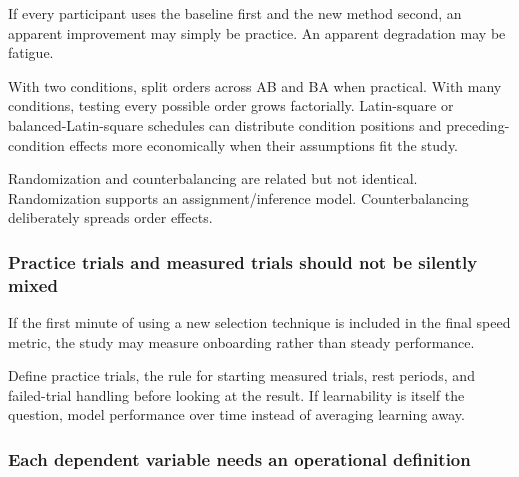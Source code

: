 \hypertarget{04-visual-computing-ii-ch035-counterbalancing-stops-condition-order-from-becoming-a-hidden-treatment}{}

If every participant uses the baseline first and the new method second, an apparent improvement may simply be practice. An apparent degradation may be fatigue.

With two conditions, split orders across AB and BA when practical. With many conditions, testing every possible order grows factorially. Latin-square or balanced-Latin-square schedules can distribute condition positions and preceding-condition effects more economically when their assumptions fit the study.

Randomization and counterbalancing are related but not identical. Randomization supports an assignment/inference model. Counterbalancing deliberately spreads order effects.

\begin{allmightroleexercise}

\subsubsection{Practice trials and measured trials should not be silently mixed}\label{04-visual-computing-ii-ch035-practice-trials-and-measured-trials-should-not-be-silently-mixed}

\hypertarget{04-visual-computing-ii-ch035-practice-trials-and-measured-trials-should-not-be-silently-mixed}{}

If the first minute of using a new selection technique is included in the final speed metric, the study may measure onboarding rather than steady performance.

\end{allmightroleexercise}

Define practice trials, the rule for starting measured trials, rest periods, and failed-trial handling before looking at the result. If learnability is itself the question, model performance over time instead of averaging learning away.

\subsubsection{Each dependent variable needs an operational definition}\label{04-visual-computing-ii-ch035-each-dependent-variable-needs-an-operational-definition}

\hypertarget{04-visual-computing-ii-ch035-each-dependent-variable-needs-an-operational-definition}{}

